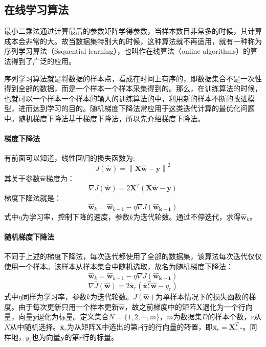 \documentclass[12pt,a4paper,draft]{ctexart}
\begin{document}
\subsection{在线学习算法}
最小二乘法通过计算最后的参数矩阵学得参数，当样本数目非常多的时候，其计算成本会非常的大。故当数据集特别大的时候，这种算法就不再适用，就有一种称为序列学习算法（Ssquential learning），也叫作在线算法（online algorithms）的算法得到了广泛的应用。

序列学习算法就是将数据的样本点，看成在时间上有序的，即数据集合不是一次性得到全部的数据，而是一个样本一个样本采集得到的。那么，在训练算法的时候，也就可以一个样本一个样本的输入的训练算法的中，利用新的样本不断的改进模型，进而达到学习的目的。随机梯度下降法常应用于这类迭代计算的最优化问题中。随机梯度下降法基于梯度下降法，所以先介绍梯度下降法。

\paragraph{梯度下降法}
有前面可以知道，线性回归的损失函数为:
\[ J(\mathbf{\hat{w}})=\left \| \mathbf{X}\mathbf{\hat{w}}-\mathbf{y} \right \|^{2} \]
其关于参数$ \mathbf{\hat{w}} $梯度为：
\[ \nabla J(\mathbf{\hat{w}})=2\textbf{X}^T(\textbf{X}\hat{\textbf{w}}-\textbf{y}) \]
梯度下降法就是：
\[ \mathbf{\hat{w}}_{k} = \mathbf{\hat{w}}_{k-1}- \eta \nabla J(\mathbf{\hat{w}_{k-1}}) \]
式中$\eta$为学习率，控制下降的速度，参数$ k $为迭代轮数。通过不停迭代，求得$ \mathbf{\hat{w}}_{k} $。
\paragraph{随机梯度下降法}
不同于上述的梯度下降法，每次迭代都使用了全部的数据集，该算法每次迭代仅仅使用一个样本。该样本从样本集合中随机选取，故名为随机梯度下降法：
\[\mathbf{\hat{w}}_{k} = \mathbf{\hat{w}}_{k-1}- \eta \nabla\bar{J}(\mathbf{\hat{w}_{k-1}})\]  
\[\nabla\bar{J}(\mathbf{\hat{w}})=2 \bar{\textbf{x}}_{r}(\bar{\textbf{x}}_{r}^T\mathbf{\hat{w}} - y_{r}) \] 
式中$\eta$同样为学习率，参数$ k $为迭代轮数。$ \bar{J}(\mathbf{\hat{w}}) $为单样本情况下的损失函数的梯度。由于每次更新只用一个样本更新$ \mathbf{\hat{w}} $，故之前梯度中的矩阵$ \textbf{X} $退化为一个行向量，向量$ \textbf{y} $退化为标量。定义集合$ N=\{1,2,\cdots,m\} $，$ m $为数据集$ D $的样本个数，$ r $从$ N $从中随机选择。$ \bar{\textbf{x}}_{r} $为从矩阵$ \textbf{X} $中选出的第$ r $行的行向量的转置，即$ \bar{\textbf{x}}_{r}=\textbf{X}_{r,*}^T $。同样地，$ y_{r} $也为向量$ \textbf{y} $的第$ r $行的标量。
\end{document}
